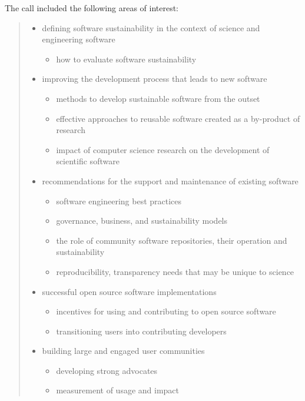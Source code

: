 \documentclass[11pt, oneside]{amsart}
\begin{document}
The call included the following areas of interest:
\begin{quote}
\begin{itemize} 
\renewcommand{\labelenumi}{\textbf{\theenumi}.}
\setlength{\rightmargin}{1em}
\item defining software sustainability in the context of science and engineering
software
\begin{itemize}
\item how to evaluate software sustainability
\end{itemize}

\item improving the development process that leads to new software
\begin{itemize}
\item methods to develop sustainable software from the outset
\item effective approaches to reusable software created as a by-product of
research
\item impact of computer science research on the development of scientific
software
\end{itemize}

\item recommendations for the support and maintenance of existing software
\begin{itemize}
\item software engineering best practices
\item governance, business, and sustainability models
\item the role of community software repositories, their operation and
sustainability
\item reproducibility, transparency needs that may be unique to science
\end{itemize}

\item successful open source software implementations
\begin{itemize}
\item incentives for using and contributing to open source software
\item transitioning users into contributing developers
\end{itemize}

\item building large and engaged user communities
\begin{itemize}
\item developing strong advocates
\item measurement of usage and impact
\end{itemize}


\end{itemize}
\end{quote}
\end{document}

